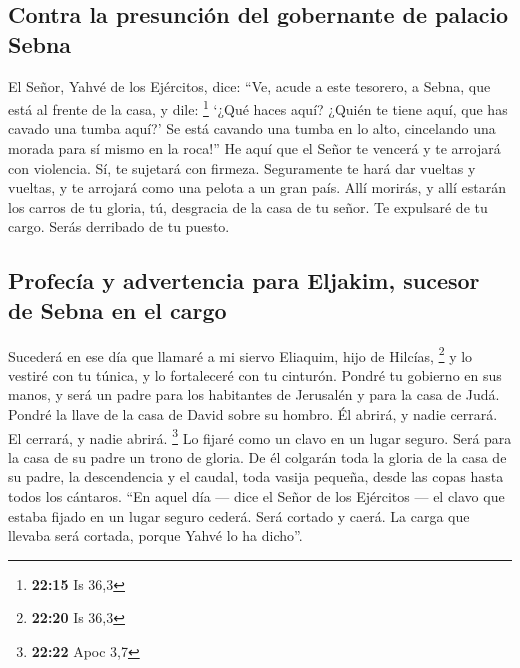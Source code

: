 \begin{paracol}{2}
\hypertarget{contra-la-presunciuxf3n-del-gobernante-de-palacio-sebna}{%
\subsection{Contra la presunción del gobernante de palacio
Sebna}\label{contra-la-presunciuxf3n-del-gobernante-de-palacio-sebna}}

 El Señor, Yahvé de los Ejércitos, dice: ``Ve, acude a
este tesorero, a Sebna, que está al frente de la casa, y dile:
\footnote{\textbf{22:15} Is 36,3}  `¿Qué haces aquí?
¿Quién te tiene aquí, que has cavado una tumba aquí?' Se está cavando
una tumba en lo alto, cincelando una morada para sí mismo en la roca!''
 He aquí que el Señor te vencerá y te arrojará con
violencia. Sí, te sujetará con firmeza.  Seguramente te
hará dar vueltas y vueltas, y te arrojará como una pelota a un gran
país. Allí morirás, y allí estarán los carros de tu gloria, tú,
desgracia de la casa de tu señor.  Te expulsaré de tu
cargo. Serás derribado de tu puesto.

\hypertarget{profecuxeda-y-advertencia-para-eljakim-sucesor-de-sebna-en-el-cargo}{%
\subsection{Profecía y advertencia para Eljakim, sucesor de Sebna en el
cargo}\label{profecuxeda-y-advertencia-para-eljakim-sucesor-de-sebna-en-el-cargo}}

 Sucederá en ese día que llamaré a mi siervo Eliaquim,
hijo de Hilcías, \footnote{\textbf{22:20} Is 36,3}  y lo
vestiré con tu túnica, y lo fortaleceré con tu cinturón. Pondré tu
gobierno en sus manos, y será un padre para los habitantes de Jerusalén
y para la casa de Judá.  Pondré la llave de la casa de
David sobre su hombro. Él abrirá, y nadie cerrará. El cerrará, y nadie
abrirá. \footnote{\textbf{22:22} Apoc 3,7}  Lo fijaré
como un clavo en un lugar seguro. Será para la casa de su padre un trono
de gloria.  De él colgarán toda la gloria de la casa de
su padre, la descendencia y el caudal, toda vasija pequeña, desde las
copas hasta todos los cántaros.  ``En aquel día --- dice
el Señor de los Ejércitos --- el clavo que estaba fijado en un lugar
seguro cederá. Será cortado y caerá. La carga que llevaba será cortada,
porque Yahvé lo ha dicho''.

\switchcolumn
\begin{otherlanguage}{english}


\end{otherlanguage}
\end{paracol}
